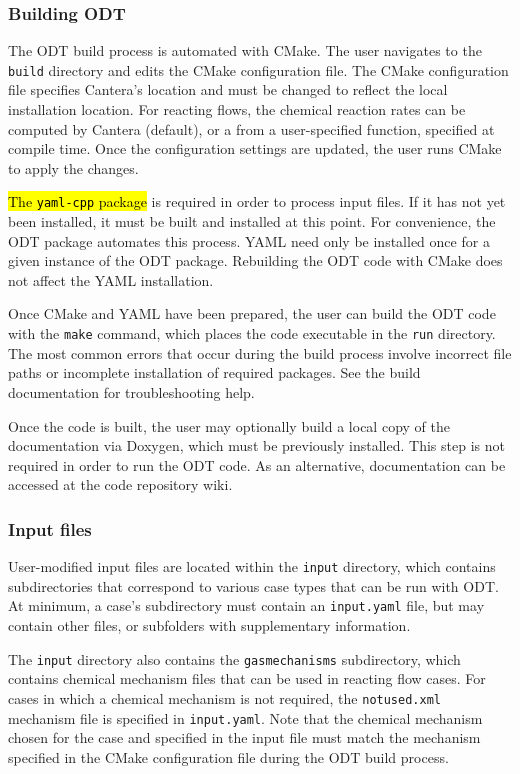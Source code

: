\documentclass[preprint,12pt, a4paper]{elsarticle}
\begin{document}
\subsubsection{Building ODT}

The ODT build process is automated with CMake. The user navigates to the \texttt{build} directory and edits the CMake configuration file. The CMake configuration file specifies Cantera's location and must be changed to reflect the local installation location. For reacting flows, the chemical reaction rates can be computed by Cantera (default), or a from a user-specified function, specified at compile time. Once the configuration settings are updated, the user runs CMake to apply the changes. 

\hl{The \texttt{yaml-cpp} package} is required in order to process input files. If it has not yet been installed, it must be built and installed at this point. For convenience, the ODT package automates this process. YAML need only be installed once for a given instance of the ODT package. Rebuilding the ODT code with CMake does not affect the YAML installation. 

Once CMake and YAML have been prepared, the user can build the ODT code with the \texttt{make} command, which places the code executable in the \texttt{run} directory. The most common errors that occur during the build process involve incorrect file paths or incomplete installation of required packages. See the build documentation for troubleshooting help. 

Once the code is built, the user may optionally build a local copy of the documentation via Doxygen, which must be previously installed. This step is not required in order to run the ODT code. As an alternative, documentation can be accessed at the code repository wiki. 

\subsubsection{Input files}

User-modified input files are located within the \texttt{input} directory, which contains subdirectories that correspond to various case types that can be run with ODT. At minimum, a case's subdirectory must contain an \texttt{input.yaml} file, but may contain other files, or subfolders with supplementary information. 

The \texttt{input} directory also contains the \texttt{gas\textunderscore mechanisms} subdirectory, which contains chemical mechanism files that can be used in reacting flow cases. For cases in which a chemical mechanism is not required, the \texttt{not\textunderscore used.xml} mechanism file is specified in \texttt{input.yaml}. Note that the chemical mechanism chosen for the case and specified in the input file must match the mechanism specified in the CMake configuration file during the ODT build process. 
\end{document}
